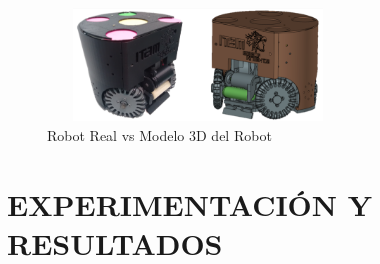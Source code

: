 \documentclass[twocolumn,10pt]{amrob}
\begin{document}
\begin{figure}
  \centering
    \includegraphics[height=3cm,width=8cm]{realVS3D.png}
  \caption{Robot Real vs Modelo 3D del Robot}
  \label{fig:ModRealVSdes}
\end{figure}

\section*{EXPERIMENTACIÓN Y RESULTADOS}
\end{document}
